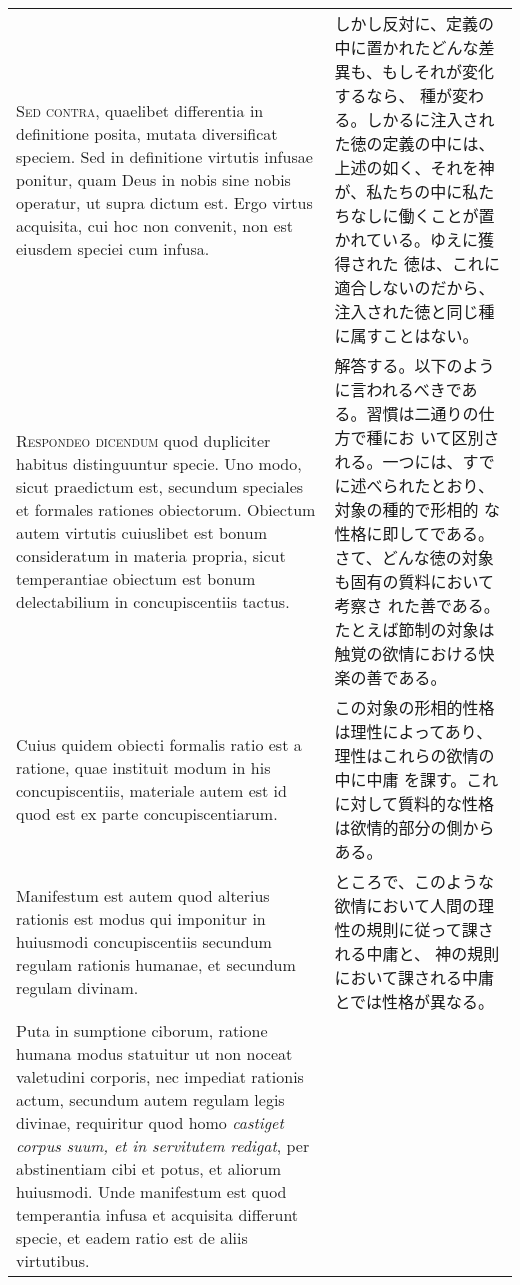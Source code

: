 \documentclass[10pt]{jsarticle}
\begin{document}
\begin{longtable}{p{21em}p{21em}}
{\scshape Sed contra}, quaelibet differentia in definitione posita,
mutata diversificat speciem. Sed in definitione virtutis infusae
ponitur, quam Deus in nobis sine nobis operatur, ut supra dictum
est. Ergo virtus acquisita, cui hoc non convenit, non est eiusdem
speciei cum infusa.

&

 しかし反対に、定義の中に置かれたどんな差異も、もしそれが変化するなら、
 種が変わる。しかるに注入された徳の定義の中には、上述の如く、それを神
 が、私たちの中に私たちなしに働くことが置かれている。ゆえに獲得された
 徳は、これに適合しないのだから、注入された徳と同じ種に属すことはない。
 
\\


{\scshape Respondeo dicendum} quod dupliciter habitus distinguuntur
specie. Uno modo, sicut praedictum est, secundum speciales et formales
rationes obiectorum. Obiectum autem virtutis cuiuslibet est bonum
consideratum in materia propria, sicut temperantiae obiectum est bonum
delectabilium in concupiscentiis tactus.

&

 解答する。以下のように言われるべきである。習慣は二通りの仕方で種にお
 いて区別される。一つには、すでに述べられたとおり、対象の種的で形相的
 な性格に即してである。さて、どんな徳の対象も固有の質料において考察さ
 れた善である。たとえば節制の対象は触覚の欲情における快楽の善である。
 
\\


Cuius quidem obiecti formalis ratio est a ratione, quae instituit
modum in his concupiscentiis, materiale autem est id quod est ex parte
 concupiscentiarum.

 &

 この対象の形相的性格は理性によってあり、理性はこれらの欲情の中に中庸
 を課す。これに対して質料的な性格は欲情的部分の側からある。

 \\

 Manifestum est autem quod alterius rationis est
modus qui imponitur in huiusmodi concupiscentiis secundum regulam
rationis humanae, et secundum regulam divinam.

&

ところで、このような欲情において人間の理性の規則に従って課される中庸と、
神の規則において課される中庸とでは性格が異なる。
 
\\


Puta in sumptione ciborum, ratione humana modus statuitur ut non
noceat valetudini corporis, nec impediat rationis actum, secundum
autem regulam legis divinae, requiritur quod homo {\itshape castiget corpus
suum, et in servitutem redigat}, per abstinentiam cibi et potus, et
aliorum huiusmodi. Unde manifestum est quod temperantia infusa et
acquisita differunt specie, et eadem ratio est de aliis virtutibus.


\end{longtable}
\end{document}

